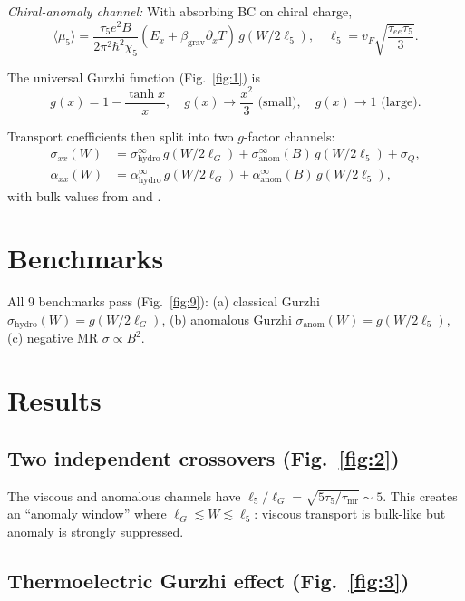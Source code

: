 \documentclass[twocolumn,11pt]{article}
\begin{document}
\textit{Chiral-anomaly channel:} With absorbing BC on chiral charge,
\begin{equation}
\langle \mu_5 \rangle = \frac{\tau_5 e^2 B}{2\pi^2\hbar^2\chi_5}(E_x + \beta_{\mathrm{grav}}\partial_x T) \, 
g(W/2\ell_5), \quad \ell_5 = v_F\sqrt{\frac{\tau_{ee}\tau_5}{3}}.
\end{equation}

The universal Gurzhi function (Fig.~\ref{fig:1}) is
\begin{equation}
g(x) = 1 - \frac{\tanh x}{x}, \quad g(x) \to \frac{x^2}{3} \text{ (small)}, \quad 
g(x) \to 1 \text{ (large)}.
\end{equation}

Transport coefficients then split into two $g$-factor channels:
\begin{align}
\sigma_{xx}(W) &= \sigma_{\mathrm{hydro}}^\infty \, g(W/2\ell_G) + \sigma_{\mathrm{anom}}^\infty(B) \, g(W/2\ell_5) + \sigma_Q, \\
\alpha_{xx}(W) &= \alpha_{\mathrm{hydro}}^\infty \, g(W/2\ell_G) + \alpha_{\mathrm{anom}}^\infty(B) \, g(W/2\ell_5),
\end{align}
with bulk values from \citep{Lucas2016} and \citep{Messica2023}.

\section{Benchmarks}

All 9 benchmarks pass (Fig.~\ref{fig:9}): (a) classical Gurzhi \citep{Gurzhi1963} $\sigma_{\mathrm{hydro}}(W) = g(W/2\ell_G)$, 
(b) anomalous Gurzhi \citep{Sukhachov2022} $\sigma_{\mathrm{anom}}(W) = g(W/2\ell_5)$, (c) negative MR \citep{Son2013} $\sigma \propto B^2$.

\section{Results}

\subsection{Two independent crossovers (Fig.~\ref{fig:2})}

The viscous and anomalous channels have $\ell_5/\ell_G = \sqrt{5\tau_5/\tau_{\mathrm{mr}}} \sim 5$.
This creates an ``anomaly window'' where $\ell_G \lesssim W \lesssim \ell_5$: viscous 
transport is bulk-like but anomaly is strongly suppressed.

\subsection{Thermoelectric Gurzhi effect (Fig.~\ref{fig:3})}
\end{document}

